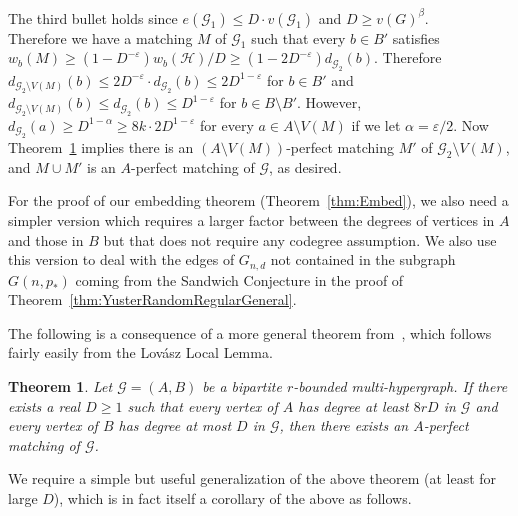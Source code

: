 \documentclass[11pt]{article}
\numberwithin{equation}{section}
\newcommand{\eps}{\varepsilon}
\newcounter{i}
\theoremstyle{plain}
\newtheorem{thm}{Theorem}[section]
\theoremstyle{plain} %
\theoremstyle{definition}
\newcommand{\cH}{\mathcal{H}}
\newcommand{\cG}{\mathcal{G}}
\begin{document}
{The third bullet holds since $e(\cG_1) \leq D\cdot v(\cG_1)$ and $D \geq v(G)^\beta$.\\
\indent Therefore we have a matching $M$ of $\cG_1$ such that every $b\in B'$ satisfies $w_b(M) \geq (1 - D^{-\eps})w_b(\cH) / D \geq (1 - 2D^{-\eps})d_{\cG_2}(b)$.  Therefore $d_{\cG_2\setminus V(M)}(b) \leq 2D^{-\eps}\cdot d_{\cG_2}(b) \leq 2D^{1- 
 \eps}$ for $b\in B'$ and $d_{\cG_2\setminus V(M)}(b) \leq d_{\cG_2}(b) \leq D^{1-\eps}$ for $b \in B \setminus B'$.  However, $d_{\cG_2}(a) \geq D^{1 - \alpha} \geq 8k\cdot 2D^{1-\eps}$ for every $a \in A\setminus V(M)$ if we let $\alpha = \eps / 2$.  Now Theorem~\ref{thm:EasyPerfectMatching} implies there is an $(A \setminus V(M))$-perfect matching $M'$ of $\cG_2 \setminus V(M)$, and $M \cup M'$ is an $A$-perfect matching of $\cG$, as desired.
}


For the proof of our embedding theorem (Theorem~\ref{thm:Embed}), we also need a simpler version which requires a larger factor between the degrees of vertices in $A$ and those in $B$ but that does not require any codegree assumption. We also use this version to deal with the edges of $G_{n,d}$ not contained in the subgraph $G(n,p_*)$ coming from the Sandwich Conjecture in the proof of Theorem~\ref{thm:YusterRandomRegularGeneral}.

The following is a consequence of a more general theorem from~\cite{DP22}, which follows fairly easily from the Lov\'asz Local Lemma.

\begin{thm}\label{thm:EasyPerfectMatching}
Let $\cG=(A,B)$ be a bipartite $r$-bounded multi-hypergraph. If there exists a real $D\ge 1$ such that every vertex of $A$ has degree at least $8rD$ in $\cG$ and every vertex of $B$ has degree at most $D$ in $\cG$, then there exists an $A$-perfect matching of $\cG$.
\end{thm}

We require a simple but useful generalization of the above theorem (at least for large $D$), which is in fact itself a corollary of the above as follows.
\end{document}
